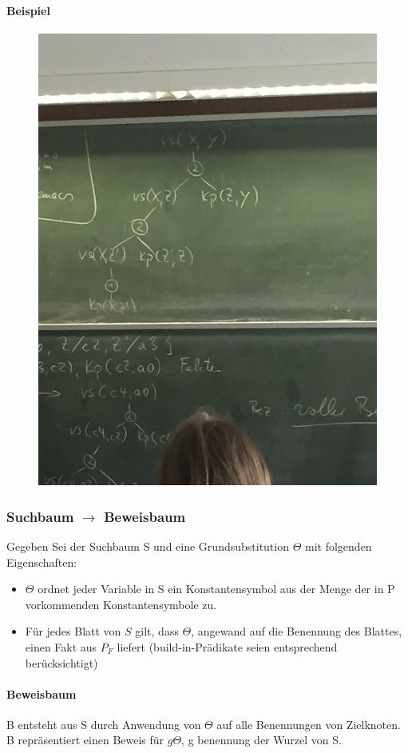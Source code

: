 \documentclass[12pt, a4paper]{article}
\begin{document}
\paragraph{Beispiel}
\begin{figure}
\centering
\includegraphics[width=0.7\linewidth]{img/img7}
\caption{}
\label{fig:img7}
\end{figure}

\subsubsection*{Suchbaum $\rightarrow$ Beweisbaum}
Gegeben Sei der Suchbaum S und eine Grundsubstitution $\Theta$ mit folgenden Eigenschaften:
\begin{itemize}
\item $\Theta$ ordnet jeder Variable in S ein Konstantensymbol aus der Menge der in P vorkommenden Konstantensymbole zu.
\item Für jedes Blatt von $S$ gilt, dass $\Theta$, angewand auf die Benennung des Blattes, einen Fakt aus $P_F$ liefert (build-in-Prädikate seien entsprechend berücksichtigt)
\end{itemize}

\paragraph{Beweisbaum} B entsteht aus S durch Anwendung von $\Theta$ auf alle Benennungen von Zielknoten. B repräsentiert einen Beweis für $g\Theta$, g benennung der Wurzel von S.
\end{document}
